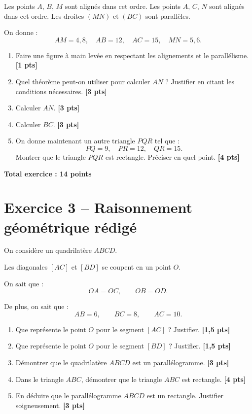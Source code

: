\documentclass[11pt,a4paper]{article}
\newcommand{\points}[1]{\hfill \textbf{[#1 pts]}}
\newcommand{\totalexo}[1]{\begin{flushright}\textbf{Total exercice : #1 points}\end{flushright}}
\begin{document}
Les points $A$, $B$, $M$ sont alignés dans cet ordre.  
Les points $A$, $C$, $N$ sont alignés dans cet ordre.  
Les droites $(MN)$ et $(BC)$ sont parallèles.

On donne :
\[
AM=4,8, \quad AB=12, \quad AC=15, \quad MN=5,6.
\]

\begin{enumerate}
    \item Faire une figure à main levée en respectant les alignements et le parallélisme. \points{1}

    \item Quel théorème peut-on utiliser pour calculer $AN$ ? Justifier en citant les conditions nécessaires. \points{3}

    \item Calculer $AN$. \points{3}

    \item Calculer $BC$. \points{3}

    \item On donne maintenant un autre triangle $PQR$ tel que :
    \[
    PQ=9, \quad PR=12, \quad QR=15.
    \]
    Montrer que le triangle $PQR$ est rectangle. Préciser en quel point. \points{4}
\end{enumerate}

\totalexo{14}

\section*{Exercice 3 -- Raisonnement géométrique rédigé}

On considère un quadrilatère $ABCD$.

Les diagonales $[AC]$ et $[BD]$ se coupent en un point $O$.

On sait que :
\[
OA=OC, \qquad OB=OD.
\]

De plus, on sait que :
\[
AB=6, \qquad BC=8, \qquad AC=10.
\]

\begin{enumerate}
    \item Que représente le point $O$ pour le segment $[AC]$ ? Justifier. \points{1,5}

    \item Que représente le point $O$ pour le segment $[BD]$ ? Justifier. \points{1,5}

    \item Démontrer que le quadrilatère $ABCD$ est un parallélogramme. \points{3}

    \item Dans le triangle $ABC$, démontrer que le triangle $ABC$ est rectangle. \points{4}

    \item En déduire que le parallélogramme $ABCD$ est un rectangle. Justifier soigneusement. \points{3}
\end{enumerate}
\end{document}
